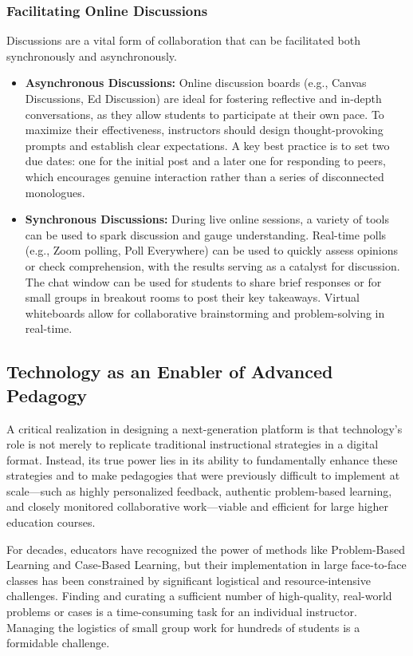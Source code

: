 \documentclass{article}
\begin{document}
\subsubsection{Facilitating Online Discussions}

Discussions are a vital form of collaboration that can be facilitated both synchronously and asynchronously.
\begin{itemize}
    \item \textbf{Asynchronous Discussions:} Online discussion boards (e.g., Canvas Discussions, Ed Discussion) are ideal for fostering reflective and in-depth conversations, as they allow students to participate at their own pace.\cite{48, 67} To maximize their effectiveness, instructors should design thought-provoking prompts and establish clear expectations. A key best practice is to set two due dates: one for the initial post and a later one for responding to peers, which encourages genuine interaction rather than a series of disconnected monologues.\cite{67}
    \item \textbf{Synchronous Discussions:} During live online sessions, a variety of tools can be used to spark discussion and gauge understanding. Real-time polls (e.g., Zoom polling, Poll Everywhere) can be used to quickly assess opinions or check comprehension, with the results serving as a catalyst for discussion.\cite{47, 67} The chat window can be used for students to share brief responses or for small groups in breakout rooms to post their key takeaways.\cite{67} Virtual whiteboards allow for collaborative brainstorming and problem-solving in real-time.\cite{48}
\end{itemize}

\subsection{Technology as an Enabler of Advanced Pedagogy}

A critical realization in designing a next-generation platform is that technology's role is not merely to replicate traditional instructional strategies in a digital format. Instead, its true power lies in its ability to fundamentally enhance these strategies and to make pedagogies that were previously difficult to implement at scale—such as highly personalized feedback, authentic problem-based learning, and closely monitored collaborative work—viable and efficient for large higher education courses.

For decades, educators have recognized the power of methods like Problem-Based Learning and Case-Based Learning, but their implementation in large face-to-face classes has been constrained by significant logistical and resource-intensive challenges.\cite{52, 53} Finding and curating a sufficient number of high-quality, real-world problems or cases is a time-consuming task for an individual instructor. Managing the logistics of small group work for hundreds of students is a formidable challenge.
\end{document}
